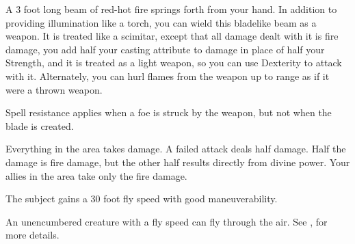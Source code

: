 \spelldur{\durlong \dismissable}
\begin{spelleffect}
    A 3 foot long beam of red-hot fire springs forth from your hand. In addition to providing illumination like a torch, you can wield this bladelike beam as a weapon. It is treated like a scimitar, except that all damage dealt with it is fire damage, you add half your casting attribute to damage in place of half your Strength, and it is treated as a light weapon, so you can use Dexterity to attack with it. Alternately, you can hurl flames from the weapon up to \rngmed range as if it were a thrown weapon.
\end{spelleffect}
\begin{spellnotes}
    \firespellnotes

    Spell resistance applies when a foe is struck by the weapon, but not when the blade is created.
\end{spellnotes}

\begin{spelleffect}
    Everything in the area takes damage. A failed attack deals half damage. Half the damage is fire damage, but the other half results directly from divine power. Your allies in the area take only the fire damage.
\end{spelleffect}
\begin{spellnotes}
    \destructivespellnotes

    \firespellnotes
\end{spellnotes}

\spelldur{\durshort}
\begin{spelleffect}
    The subject gains a 30 foot fly speed with good maneuverability.
\end{spelleffect}
\begin{spellnotes}
    An unencumbered creature with a fly speed can fly through the air. See , for more details.
\end{spellnotes}

